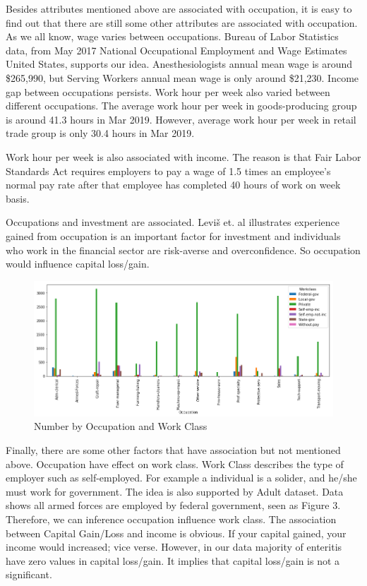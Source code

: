 \documentclass[letterpaper,12pt]{article}
\begin{document}
Besides attributes mentioned above are associated with occupation, it is easy to find out that there are still some other attributes are associated with occupation. As we all know, wage varies between occupations. Bureau of Labor Statistics data\cite{statistics_2018}, from May 2017 National Occupational Employment and Wage Estimates United States, supports our idea. Anesthesiologists annual mean wage is around \$265,990, but Serving Workers annual mean wage is only around \$21,230. Income gap between occupations persists. Work hour per week also varied between different occupations. The average work hour per week in goods-producing group is around 41.3 hours in Mar 2019. However, average work hour per week in retail trade group is only 30.4 hours in Mar 2019. \cite{statistics_2019_hours} \par

Work hour per week is also associated with income. The reason is that Fair Labor Standards Act requires employers to pay a wage of 1.5 times an employee's normal pay rate after that employee has completed 40 hours of work on week basis.\par

Occupations and investment are associated. Levi{\v{s}} et. al\cite{levivsauskaite2012impact} illustrates experience gained from occupation is an important factor for investment and individuals who work in the financial sector are risk-averse and overconfidence. So occupation would influence capital loss/gain. \par

\begin{figure}[htb]
\centering
\includegraphics[width=5in]{pics_adult/occ-workclass.png}
\caption{Number by Occupation and Work Class}
\label{fig:pathdemo}
\end{figure}

Finally, there are some other factors that have association but not mentioned above.  Occupation have effect on work class. Work Class describes the type of employer such as self-employed. For example a individual is a solider, and he/she must work for government. The idea is also supported by Adult dataset. Data shows all armed forces are employed by federal government, seen as Figure 3. Therefore, we can inference occupation influence work class. The association between Capital Gain/Loss and income is obvious. If your capital gained, your income would increased; vice verse. However, in our data majority of enteritis have zero values in capital loss/gain. It implies that capital loss/gain is not a significant. \par 
\end{document}
